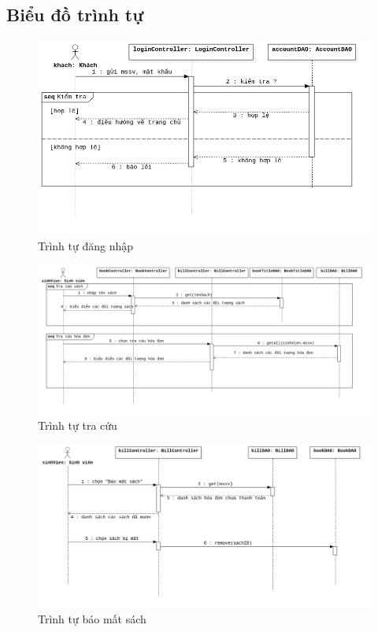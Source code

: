 \documentclass[../report.tex]{subfiles}
\begin{document}
\subsection{Biểu đồ trình tự}

\begin{figure}[H]
\centering
\includegraphics[width=15cm]{figures/dangnhapseq.png}
\caption{Trình tự đăng nhập}
\end{figure}

\begin{figure}[H]
\centering
\includegraphics[width=\textwidth]{figures/tracuuseq.png}
\caption{Trình tự tra cứu}
\end{figure}

\begin{figure}[H]
\centering
\includegraphics[width=\textwidth]{figures/baomatsachseq.png}
\caption{Trình tự báo mất sách}
\end{figure}
\end{document}

